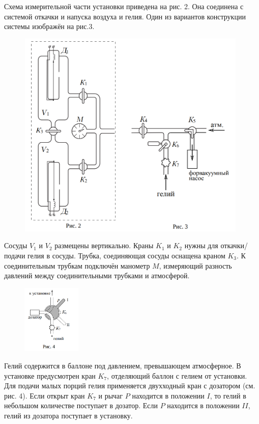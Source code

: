 \documentclass[15pt,a5paper,reqno]{article}
\begin{document}
	Схема измерительной части установки приведена на рис. 2. Она соединена с системой откачки и напуска воздуха и гелия. Один из вариантов конструкции системы изображён на рис.3.
	
	\begin{figure}[h!]
	    \centering
        \includegraphics[width = 11cm, height = 10cm]{Рисунки 2 и 3.PNG}
    \end{figure}

	Сосуды $V_1$ и $V_2$ размещены вертикально. Краны $K_1$ и $K_2$ нужны для откачки/подачи гелия в сосуды. Трубка, соединяющая сосуды оснащена краном $K_3$. К соединительным трубкам подключён манометр $M$, измеряющий разность давлений между соединительными трубками и атмосферой. 
	
	\begin{figure}
        \centering
        \includegraphics[width=0.25\textwidth]{Дозатор.PNG}
    \end{figure}
	
	Гелий содержится в баллоне под давлением, превышающем атмосферное. В установке предусмотрен кран $K_7$, отделяющий баллон с гелием от установки. Для подачи малых порций гелия применяется двухходный кран с дозатором (см. рис. 4). Если открыт кран $K_7$ и рычаг $P$ находится в положении $I$, то гелий в небольшом количестве поступает в дозатор. Если $P$ находится в положении $II$, гелий из дозатора поступает в установку.
    
\end{document}
